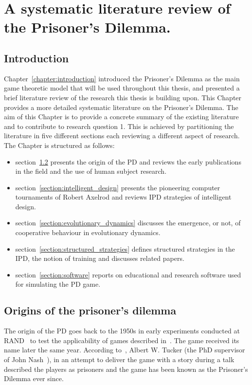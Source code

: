 \chapter{A systematic literature review of the Prisoner's Dilemma.}\label{chapter:literature_review}

\section{Introduction}

Chapter~\ref{chapter:introduction} introduced the Prisoner's Dilemma as the main
game theoretic model that will be used throughout this thesis, and presented a
brief literature review of the research this thesis is building upon. This
Chapter provides a more detailed systematic literature on the Prisoner's
Dilemma. The aim of this Chapter is to provide a concrete summary of the
existing literature and to contribute to research question 1. This is
achieved by partitioning the literature in five different sections each
reviewing a different aspect of research. The Chapter is structured as follows:

\begin{itemize}
    \item section~\ref{section:origin} presents the origin of the PD
    and reviews the early publications in the field and the use of
    human subject research.
    \item section~\ref{section:intelligent_design} presents the pioneering computer
    tournaments of Robert Axelrod and reviews IPD strategies of intelligent design.
    \item section~\ref{section:evolutionary_dynamics} discusses
    the emergence, or not, of cooperative behaviour in evolutionary dynamics.
    \item section~\ref{section:structured_strategies} defines structured
    strategies in the IPD, the notion of training and discusses related papers.
    \item section~\ref{section:software} reports on educational and research software
    used for simulating the PD game.
\end{itemize}

\section{Origins of the prisoner's dilemma}\label{section:origin}

The origin of the PD goes back to the 1950s in early experiments conducted at
RAND~\cite{Flood1958} to test the applicability of games described
in~\cite{VonNeumann1944}. The game received its name later the same year.
According to~\cite{Tucker1983}, Albert W. Tucker (the PhD supervisor of John
Nash~\cite{Nash1951}), in an attempt to deliver the game with a story during a
talk described the players as prisoners and the game has been known as the
Prisoner's Dilemma ever since.

